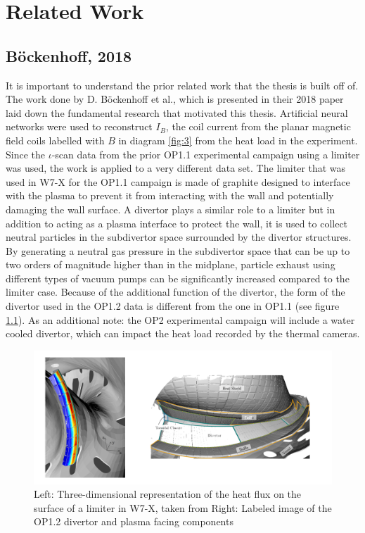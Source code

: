 %
\chapter{Related Work}
\label{sec:related}

\section{Böckenhoff, 2018}
It is important to understand the prior related work that the thesis is built off of. The work done by D. Böckenhoff et al., which is presented in their 2018 paper \cite{Böckenhoff_2018} laid down the fundamental research that motivated this thesis. Artificial neural networks were used to reconstruct $I_B$, the coil current from the planar magnetic field coils labelled with $B$ in diagram \ref{fig:3} from the heat load in the experiment. Since the $\iota$-scan data from the prior OP1.1 experimental campaign using a limiter was used, the work is applied to a very different data set. The limiter that was used in W7-X for the OP1.1 campaign is made of graphite designed to interface with the plasma to prevent it from interacting with the wall and potentially damaging the wall surface. A divertor plays a similar role to a limiter but in addition to acting as a plasma interface to protect the wall, it is used to collect neutral particles in the subdivertor space surrounded by the divertor structures. By generating a neutral gas pressure in the subdivertor space that can be up to two orders of magnitude higher than in the midplane, particle exhaust using different types of vacuum pumps can be significantly increased compared to the limiter case. Because of the additional function of the divertor, the form of the divertor used in the OP1.2 data is different  from the one in OP1.1 (see figure \ref{fig:limiter-divertor}). As an additional note: the OP2 experimental campaign will include a water cooled divertor, which can impact the heat load recorded by the thermal cameras.

\begin{figure}[!htb]
    \centering
    \includegraphics[width = \textwidth]{images/limiter-divetor.png}
    \caption{Left: Three-dimensional representation of the heat flux on the surface of a limiter in W7-X, taken from \cite{Böckenhoff_2018} Right: Labeled image of the OP1.2 divertor and plasma facing components} \label{fig:limiter-divertor}
\end{figure}

